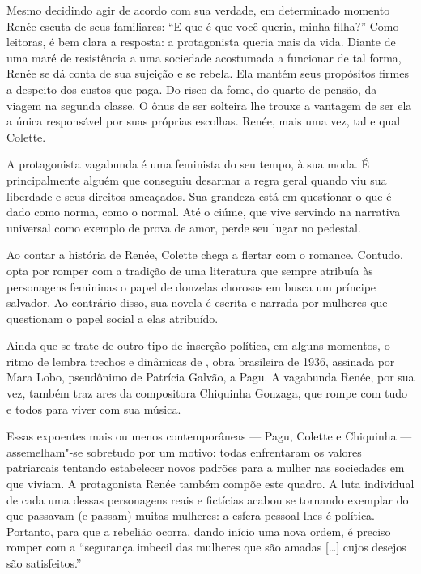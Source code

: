 \begin{changemargin}
Mesmo decidindo agir de acordo com sua verdade, em determinado momento Renée escuta de seus familiares: “E que é que você queria, minha filha?” Como leitoras, é bem clara a resposta: a protagonista queria mais da vida. Diante de uma maré de resistência a uma sociedade acostumada a funcionar de tal forma, Renée se dá conta de sua sujeição e se rebela. Ela mantém seus propósitos firmes a despeito dos custos que paga. Do risco da fome, do quarto de pensão, da viagem na segunda classe. O ônus de ser solteira lhe trouxe a vantagem de ser ela a única responsável por suas próprias escolhas. Renée, mais uma vez, tal e qual Colette. 

A protagonista vagabunda é uma feminista do seu tempo, à sua moda. É principalmente alguém que conseguiu desarmar a regra geral quando viu sua liberdade e seus direitos ameaçados. Sua grandeza está em questionar o que é dado como norma, como o normal. Até o ciúme, que vive servindo na narrativa universal como exemplo de prova de amor, perde seu lugar no pedestal. 

Ao contar a história de Renée, Colette chega a flertar com o romance. Contudo, opta por romper com a tradição de uma literatura que sempre atribuía às personagens femininas o papel de donzelas chorosas em busca um príncipe salvador. Ao contrário disso, sua novela é escrita e narrada por mulheres que questionam o papel social a elas atribuído.

Ainda que se trate de outro tipo de inserção política, em alguns momentos, o ritmo de {} lembra trechos e dinâmicas de {}, obra brasileira de 1936, assinada por Mara Lobo, pseudônimo de Patrícia Galvão, a Pagu. A vagabunda Renée, por sua vez, também traz ares da compositora Chiquinha Gonzaga, que rompe com tudo e todos para viver com sua música.

Essas expoentes mais ou menos contemporâneas --- Pagu, Colette e Chiquinha --- assemelham"-se sobretudo por um motivo: todas enfrentaram os valores patriarcais tentando estabelecer novos padrões para a mulher nas sociedades em que viviam. A protagonista Renée também compõe este quadro. A luta individual de cada uma dessas personagens reais e fictícias acabou se tornando exemplar do que passavam (e passam) muitas mulheres: a esfera pessoal lhes é política. Portanto, para que a rebelião ocorra, dando início uma nova ordem, é preciso romper com a “segurança imbecil das mulheres que são amadas [\ldots{}] cujos desejos são satisfeitos.”


\end{changemargin}
